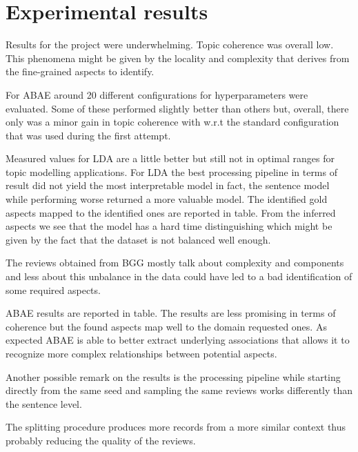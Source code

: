 \section{Experimental results}

Results for the project were underwhelming.
Topic coherence was overall low.
This phenomena might be given by the locality and complexity that derives from the fine-grained aspects to identify.

For ABAE around 20 different configurations for hyperparameters were evaluated.
Some of these performed slightly better than others but, overall, there only was a minor gain in topic coherence with
w.r.t the standard configuration that was used during the first attempt.

Measured values for LDA are a little better but still not in optimal ranges for topic modelling applications.
For LDA the best processing pipeline in terms of result did not yield the most interpretable model in fact,
the sentence model while performing worse returned a more valuable model.
The identified gold aspects mapped to the identified ones are reported in table. %
From the inferred aspects we see that the model has a hard time distinguishing %
which might be given by the fact that the dataset is not balanced well enough.

The reviews obtained from BGG mostly talk about complexity and components and less about %
this unbalance in the data could have led to a bad identification of some required aspects.

ABAE results are reported in table.
The results are less promising in terms of coherence but the found aspects map well to the domain requested
ones.
As expected ABAE is able to better extract underlying associations that allows it to recognize more complex relationships
between potential aspects.

Another possible remark on the results is the processing pipeline while starting directly from the same
seed and sampling the same reviews works differently than the sentence level.

The splitting procedure produces more records from a more similar context thus probably reducing the
quality of the reviews.